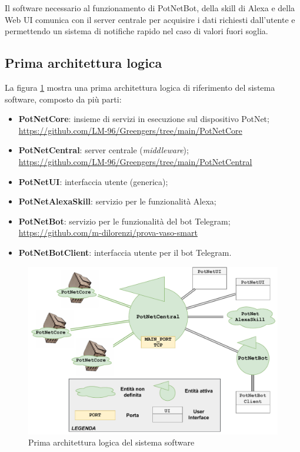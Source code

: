 Il software necessario al funzionamento di PotNetBot, della skill di Alexa e della Web UI comunica con il server centrale per acquisire i dati richiesti dall'utente e permettendo un sistema di notifiche rapido nel caso di valori fuori soglia. 

\subsection{Prima architettura logica}

La figura \ref{fig:logical_arch} mostra una prima architettura logica di riferimento del sistema software, composto da più parti:
\begin{itemize}
	\item \textbf{PotNetCore}: insieme di servizi in esecuzione sul dispositivo PotNet;\\
	\url{https://github.com/LM-96/Greengers/tree/main/PotNetCore}
	
	\item \textbf{PotNetCentral}: server centrale (\textit{middleware});\\
	\url{https://github.com/LM-96/Greengers/tree/main/PotNetCentral}
	\item \textbf{PotNetUI}: interfaccia utente (generica);
	
	\item \textbf{PotNetAlexaSkill}: servizio per le funzionalità Alexa;
	
	\item \textbf{PotNetBot}: servizio per le funzionalità del bot Telegram;\\
	\url{https://github.com/m-dilorenzi/prova-vaso-smart}
	
	\item \textbf{PotNetBotClient}: interfaccia utente per il bot Telegram.
\end{itemize}

\begin{figure}[h]
	\centering
	\includegraphics[scale=0.5]{images/logical_arch.pdf}
	\caption{Prima architettura logica del sistema software}
	\label{fig:logical_arch}
\end{figure}


